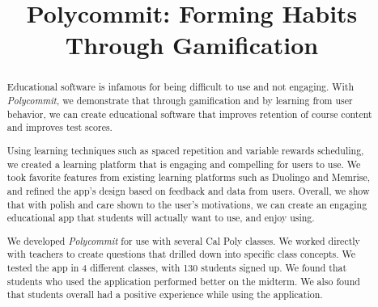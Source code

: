 \documentclass[sigconf]{acmart}
\begin{document}
\title{Polycommit: Forming Habits Through Gamification}


\begin{abstract}
\par Educational software is infamous for being difficult to use and not engaging. With \textit{Polycommit,} we demonstrate that through gamification and by learning from user behavior, we can create educational software that improves retention of course content and improves test scores.

\par Using learning techniques such as spaced repetition and variable rewards scheduling, we created a learning platform that is engaging and compelling for users to use. We took favorite features from existing learning platforms such as Duolingo and Memrise, and refined the app's design based on feedback and data from users. Overall, we show that with polish and care shown to the user's motivations, we can create an engaging educational app that students will actually want to use, and enjoy using.

\par We developed \textit{Polycommit} for use with several Cal Poly classes. We worked directly with teachers to create questions that drilled down into specific class concepts. We tested the app in 4 different classes, with 130 students signed up. We found that students who used the application performed better on the midterm. We also found that students overall had a positive experience while using the application.
\end{abstract}

%
%




\maketitle




 
\end{document}
